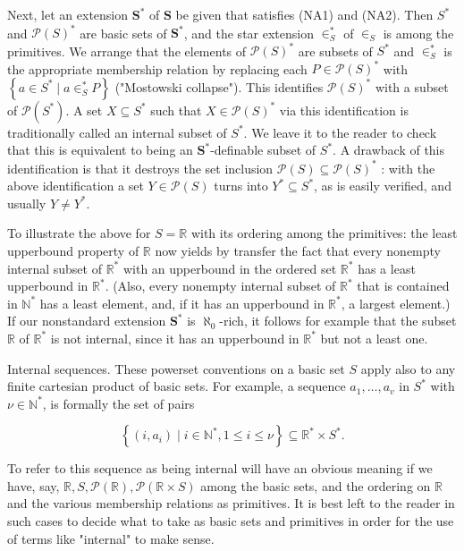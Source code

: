 \documentclass[10pt]{article}
\begin{document}
Next, let an extension $\mathbf{S}^{*}$ of $\mathbf{S}$ be given that satisfies (NA1) and (NA2). Then $S^{*}$ and $\mathcal{P}(S)^{*}$ are basic sets of $\mathbf{S}^{*}$, and the star extension $\in_{S}^{*}$ of $\in_{S}$ is among the primitives. We arrange that the elements of $\mathcal{P}(S)^{*}$ are subsets of $S^{*}$ and $\in_{S}^{*}$ is the appropriate membership relation by replacing each $P \in \mathcal{P}(S)^{*}$ with $\left\{a \in S^{*} \mid a \in_{S}^{*} P\right\}$ ("Mostowski collapse"). This identifies $\mathcal{P}(S)^{*}$ with a subset of $\mathcal{P}\left(S^{*}\right)$. A set $X \subseteq S^{*}$ such that $X \in \mathcal{P}(S)^{*}$ via this identification is traditionally called an internal subset of $S^{*}$. We leave it to the reader to check that this is equivalent to being an $\mathbf{S}^{*}$-definable subset of $S^{*}$. A drawback of this identification is that it destroys the set inclusion $\mathcal{P}(S) \subseteq \mathcal{P}(S)^{*}$ : with the above identification a set $Y \in \mathcal{P}(S)$ turns into $Y^{*} \subseteq S^{*}$, as is easily verified, and usually $Y \neq Y^{*}$.

To illustrate the above for $S=\mathbb{R}$ with its ordering among the primitives: the least upperbound property of $\mathbb{R}$ now yields by transfer the fact that every nonempty internal subset of $\mathbb{R}^{*}$ with an upperbound in the ordered set $\mathbb{R}^{*}$ has a least upperbound in $\mathbb{R}^{*}$. (Also, every nonempty internal subset of $\mathbb{R}^{*}$ that is contained in $\mathbb{N}^{*}$ has a least element, and, if it has an upperbound in $\mathbb{R}^{*}$, a largest element.) If our nonstandard extension $\mathbf{S}^{*}$ is $\boldsymbol{\aleph}_{0}$-rich, it follows for example that the subset $\mathbb{R}$ of $\mathbb{R}^{*}$ is not internal, since it has an upperbound in $\mathbb{R}^{*}$ but not a least one.

Internal sequences. These powerset conventions on a basic set $S$ apply also to any finite cartesian product of basic sets. For example, a sequence $a_{1}, \ldots, a_{v}$ in $S^{*}$ with $\nu \in \mathbb{N}^{*}$, is formally the set of pairs

$$
\left\{\left(i, a_{i}\right) \mid i \in \mathbb{N}^{*}, 1 \leq i \leq \nu\right\} \subseteq \mathbb{R}^{*} \times S^{*} .
$$

To refer to this sequence as being internal will have an obvious meaning if we have, say, $\mathbb{R}, S, \mathcal{P}(\mathbb{R}), \mathcal{P}(\mathbb{R} \times S)$ among the basic sets, and the ordering on $\mathbb{R}$ and the various membership relations as primitives. It is best left to the reader in such cases to decide what to take as basic sets and primitives in order for the use of terms like "internal" to make sense.
\end{document}
